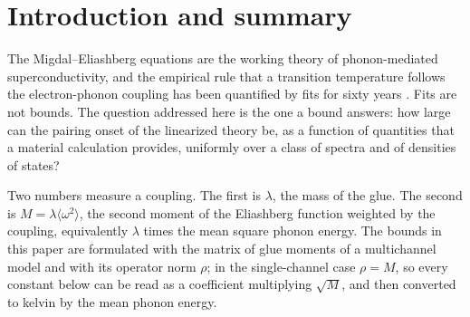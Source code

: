 \documentclass[aps,10pt,superscriptaddress,floatfix,amsmath,amssymb,nofootinbib]{revtex4-2}
\newcommand{\Tlin}{T_{\mathrm{lin}}}
\begin{document}
\begin{abstract}
Measured transition temperatures of Pb, Nb, $\mathrm{MgB_2}$ and $\mathrm{LaH_{10}}$ sit at
$0.43$, $0.23$, $0.34$ and $0.60$ of the scalar ceiling, a ratio that is numerical
throughout. Retaining the first crossed skeleton, the answer is a dichotomy: on nested flat
sheets the crossed correction does not vanish in the adiabatic limit, on curved Fermi
surfaces it vanishes linearly in the adiabatic ratio up to a logarithm cubed, a fourth
power in two dimensions, and the
all-coupling all-momentum statement remains open. A limits section collects every object
that these bounds do not describe. No statement here identifies $\Tlin$ with the transition
temperature of a material, and no material is claimed to be a superconductor by these
bounds.
This preprint has not been peer reviewed.

\end{abstract}

\maketitle

\section{Introduction and summary}

The Migdal--Eliashberg equations are the working theory of phonon-mediated
superconductivity, and the empirical rule that a transition temperature follows the
electron-phonon coupling has been quantified by fits for sixty years
\cite{mcmillan,allendynes,moussa}. Fits are not bounds. The question addressed here is
the one a bound answers: how large can the pairing onset of the linearized theory be, as
a function of quantities that a material calculation provides, uniformly over a class of
spectra and of densities of states?

Two numbers measure a coupling. The first is $\lambda$, the mass of the glue. The second
is $M=\lambda\langle\omega^{2}\rangle$, the second moment of the Eliashberg function
weighted by the coupling, equivalently $\lambda$ times the mean square phonon energy. The
bounds in this paper are formulated with the matrix of glue moments of a multichannel
model and with its operator norm $\rho$; in the single-channel case $\rho=M$, so every
constant below can be read as a coefficient multiplying $\sqrt{M}$, and then converted to
kelvin by the mean phonon energy.
\end{document}

